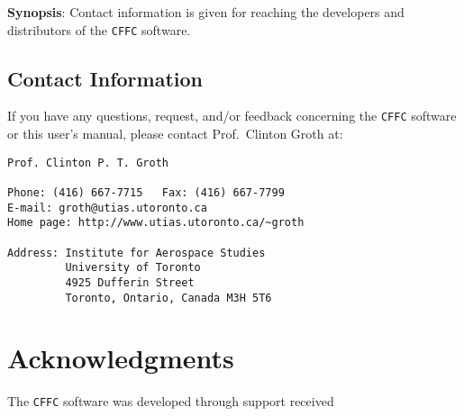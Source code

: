 \documentclass[11pt]{report}
\begin{document}
{\bf Synopsis}: Contact information is given for reaching the
                developers and distributors of the 
                {\tt CFFC} software.

\section{Contact Information}

If you have any questions, request, and/or feedback concerning the 
{\tt CFFC} software or this user's manual,
please contact Prof.\ Clinton Groth at:
\begin{verbatim}
Prof. Clinton P. T. Groth

Phone: (416) 667-7715   Fax: (416) 667-7799
E-mail: groth@utias.utoronto.ca
Home page: http://www.utias.utoronto.ca/~groth

Address: Institute for Aerospace Studies
         University of Toronto
         4925 Dufferin Street
         Toronto, Ontario, Canada M3H 5T6
\end{verbatim}

\chapter{Acknowledgments}

The {\tt CFFC} software was developed through 
support received 
\end{document}
